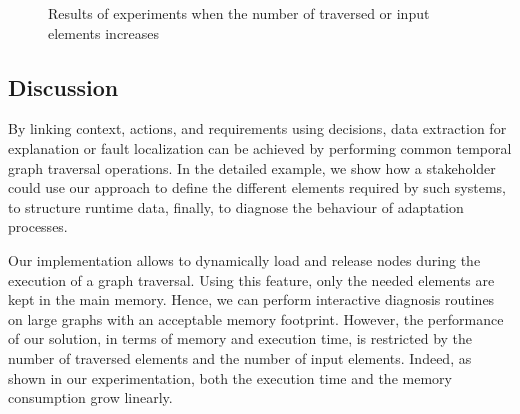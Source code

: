 \begin{figure}
	\centering
	\hfil
	\centering
	\caption{Results of experiments when the number of traversed or input elements  increases}
	\label{fig:exp-res}
\end{figure}

\subsection{Discussion}
By linking context, actions, and requirements using decisions, data extraction for explanation or fault localization can be achieved by performing common temporal graph traversal operations.
In the detailed example, we show how a stakeholder could use our approach to define the different elements required by such systems, to structure runtime data, finally, to diagnose the behaviour of adaptation processes. 

Our implementation allows to dynamically load and release nodes during the execution of a graph traversal. Using this feature, only the needed elements are kept in the main memory.  Hence, we can perform interactive diagnosis routines on large graphs with an acceptable memory footprint. 
However, the performance of our solution, in terms of memory and execution time, is restricted by the number of traversed elements and the number of input elements.
Indeed, as shown in our experimentation, both the execution time and the memory consumption grow linearly.

